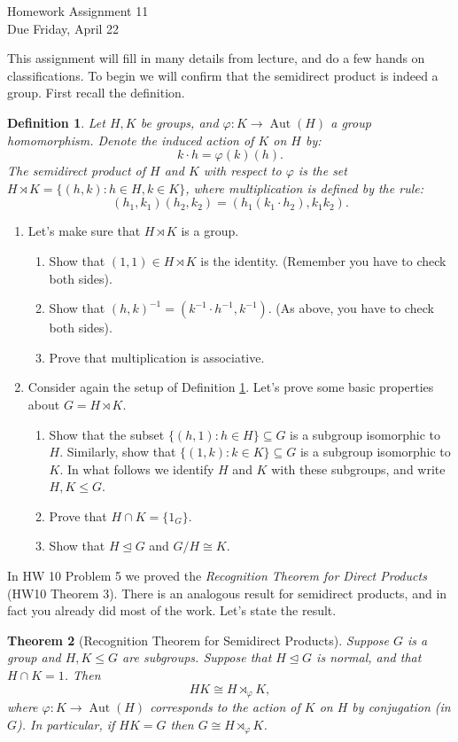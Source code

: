 \documentclass[11pt]{article}
\newtheorem{theorem}{Theorem}
\newtheorem{definition}[theorem]{Definition}
\newcommand{\Aut}{\operatorname{Aut}}
\begin{document}
\begin{center}
\Large {Homework Assignment 11}\\
\small {Due Friday, April 22}
\end{center}
This assignment will fill in many details from lecture, and do a few hands on classifications.  To begin we will confirm that the semidirect product is indeed a group.  First recall the definition.
\begin{definition}\label{semiD}
  Let $H,K$ be groups, and $\varphi:K\to\Aut(H)$ a group homomorphism.  Denote the induced action of $K$ on $H$ by:
  \[k\cdot h = \varphi(k)(h).\]
  The \textit{semidirect product} of $H$ and $K$ with respect to $\varphi$ is the set $H\rtimes K = \{(h,k):h\in H,k\in K\}$, where multiplication is defined by the rule:
  \[(h_1,k_1)(h_2,k_2) = (h_1(k_1\cdot h_2),k_1k_2).\]
\end{definition}
\begin{enumerate}
  \item{
  Let's make sure that $H\rtimes K$ is a group.
  \begin{enumerate}
    \item Show that $(1,1)\in H\rtimes K$ is the identity.  (Remember you have to check both sides).
    \item Show that $(h,k)^{-1} = (k^{-1}\cdot h^{-1},k^{-1})$. (As above, you have to check both sides).
    \item Prove that multiplication is associative.
  \end{enumerate}
  }
  \item{Consider again the setup of Definition \ref{semiD}.  Let's prove some basic properties about $G = H\rtimes K$.
  \begin{enumerate}
  \item Show that the subset $\{(h,1):h\in H\}\subseteq G$ is a subgroup isomorphic to $H$.  Similarly, show that $\{(1,k):k\in K\}\subseteq G$ is a subgroup isomorphic to $K$.  In what follows we identify $H$ and $K$ with these subgroups, and write $H,K\le G$.
  \item Prove that $H\cap K=\{1_G\}$.
  \item Show that $H\unlhd G$ and $G/H\cong K$.
   \end{enumerate}}
\end{enumerate}
In HW 10 Problem 5 we proved the \textit{Recognition Theorem for Direct Products} (HW10 Theorem 3).  There is an analogous result for semidirect products, and in fact you already did most of the work.  Let's state the result.
\begin{theorem}[Recognition Theorem for Semidirect Products]\label{recog}
Suppose $G$ is a group and $H,K\le G$ are subgroups.  Suppose that $H\unlhd G$ is normal, and that $H\cap K = 1$.  Then \[HK\cong H\rtimes_\varphi K,\]
where $\varphi:K\to\Aut(H)$ corresponds to the action of $K$ on $H$ by conjugation (in $G$).  In particular, if $HK=G$ then $G\cong H\rtimes_\varphi K$.
\end{theorem}
\end{document}
